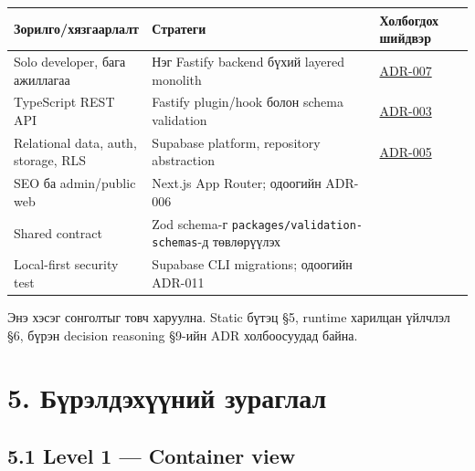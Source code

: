 \documentclass[
  mongolian,
]{article}
\begin{document}
\begin{longtable}[]{@{}
  >{\raggedright\arraybackslash}p{}
  >{\raggedright\arraybackslash}p{}
  >{\raggedright\arraybackslash}p{}@{}}
\toprule\noalign{}
\begin{minipage}[b]{\linewidth}\raggedright
Зорилго/хязгаарлалт
\end{minipage} & \begin{minipage}[b]{\linewidth}\raggedright
Стратеги
\end{minipage} & \begin{minipage}[b]{\linewidth}\raggedright
Холбогдох шийдвэр
\end{minipage} \\
\midrule\noalign{}
\endhead
\bottomrule\noalign{}
\endlastfoot
Solo developer, бага ажиллагаа & Нэг Fastify backend бүхий layered
monolith &
\href{https://github.com/Tengis01/Nogoolin/blob/main/docs/architecture/adr/adr-007-layered-monolith.md}{ADR-007} \\
TypeScript REST API & Fastify plugin/hook болон schema validation &
\href{https://github.com/Tengis01/Nogoolin/blob/main/docs/architecture/adr/adr-003-fastify.md}{ADR-003} \\
Relational data, auth, storage, RLS & Supabase platform, repository
abstraction &
\href{https://github.com/Tengis01/Nogoolin/blob/main/docs/architecture/adr/adr-005-supabase.md}{ADR-005} \\
SEO ба admin/public web & Next.js App Router; одоогийн ADR-006 & \\
Shared contract & Zod schema-г \texttt{packages/validation-schemas}-д
төвлөрүүлэх & \\
Local-first security test & Supabase CLI migrations; одоогийн ADR-011
& \\
\end{longtable}

Энэ хэсэг сонголтыг товч харуулна. Static бүтэц §5, runtime харилцан
үйлчлэл §6, бүрэн decision reasoning §9-ийн ADR холбоосуудад байна.

\section{5. Бүрэлдэхүүний
зураглал}\label{ux431ux4afux440ux44dux43bux434ux44dux445ux4afux4afux43dux438ux439-ux437ux443ux440ux430ux433ux43bux430ux43b}

\subsection{5.1 Level 1 --- Container
view}\label{level-1-container-view}
\end{document}
